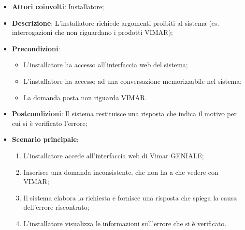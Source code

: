 \begin{itemize}
    \item \textbf{Attori coinvolti}: Installatore;
    \item \textbf{Descrizione}: L’installatore richiede argomenti proibiti al sistema (es. interrogazioni che non riguardano i prodotti VIMAR);
    \item \textbf{Precondizioni}: 
        \begin{itemize}
            \item L’installatore ha accesso all’interfaccia web del sistema;
            \item L’installatore ha accesso ad una conversazione memorizzabile nel sistema;
            \item La domanda posta non riguarda VIMAR.
        \end{itemize}
    \item \textbf{Postcondizioni}: Il sistema restituisce una risposta che indica il motivo per cui si è verificato l’errore;
    \item \textbf{Scenario principale}:
    \begin{enumerate}
    \item L’installatore accede all’interfaccia web di Vimar GENIALE;
    \item Inserisce una domanda inconsistente, che non ha a che vedere con VIMAR;
    \item Il sistema elabora la richiesta e fornisce una risposta che spiega la causa dell'errore riscontrato;
    \item L’installatore visualizza le informazioni sull’errore che si è verificato.
    \end{enumerate}
\end{itemize}